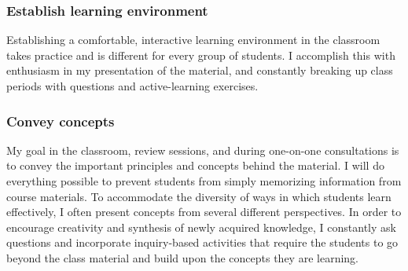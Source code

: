 \subsubsection*{Establish learning environment}
Establishing a comfortable, interactive learning environment in the classroom
takes practice and is different for every group of students.
I accomplish this with enthusiasm in my presentation of the material, and
constantly breaking up class periods with questions and active-learning
exercises.

\subsubsection*{Convey concepts}
My goal in the classroom, review sessions, and during one-on-one consultations
is to convey the important principles and concepts behind the material.
I will do everything possible to prevent students from simply memorizing
information from course materials.
To accommodate the diversity of ways in which students learn effectively, I
often present concepts from several different perspectives.
In order to encourage creativity and synthesis of newly acquired knowledge,
I constantly ask questions and incorporate inquiry-based activities that
require the students to go beyond the class material and build upon the
concepts they are learning.

